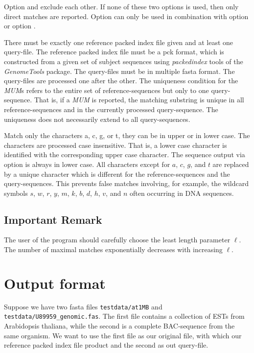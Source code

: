 \documentclass[12pt]{article}
\newcommand{\GenomeTools}{\textit{GenomeTools}\xspace}
\newcommand{\MUM}[0]{\textit{MUM}\xspace}
\newcommand{\packedindex}{\textit{packedindex}\xspace}
\begin{document}
Option  and  exclude each other. If none
of these two options is used, then only direct matches are reported.
Option  can only be used in combination with
option  or option .

There must be exactly one reference packed index file given and at least one
query-file.
The reference packed index file must be a pck format, which is constructed from a given set of subject sequences 
using \packedindex tools of the \GenomeTools package. The query-files must be in multiple fasta format.
The query-files are processed one after the other. The uniqueness condition
for the \MUM{s} refers to the entire set of reference-sequences but
only to one query-sequence. That is, if a \MUM is reported, the
matching substring is unique in all reference-sequences and in the currently
processed query-sequence. The uniqueness does not necessarily extend to
all query-sequences.

Match only the characters a, c, g, or t, they can be in upper or in lower case.
The characters are processed case insensitive. That is, a 
lower case character is identified with the corresponding upper case 
character. The sequence output via option  is always
in lower case. 
All characters except for $a$, $c$, $g$, and $t$ are replaced by
a unique character which is different for the reference-sequences and
the query-sequences. This prevents false matches involving, for
example, the wildcard symbols $s$, $w$, $r$, $y$, $m$, $k$, $b$, 
$d$, $h$, $v$, and $n$ often occurring in DNA sequences.

\subsection*{Important Remark} 
The user of the program should carefully choose the least length parameter \(\ell\).
The number of maximal matches exponentially decreases with increasing
\(\ell\).

\section{Output format}
Suppose we have two fasta files \texttt{testdata/at1MB} and
\texttt{testdata/U89959\_genomic.fas}. The first file contains 
a collection of ESTs from Arabidopsis thaliana, while the second is 
a complete BAC-sequence from the same organism. We want to use the first file as our
original file, with which our reference packed index file product and the second as out query-file.
\end{document}
